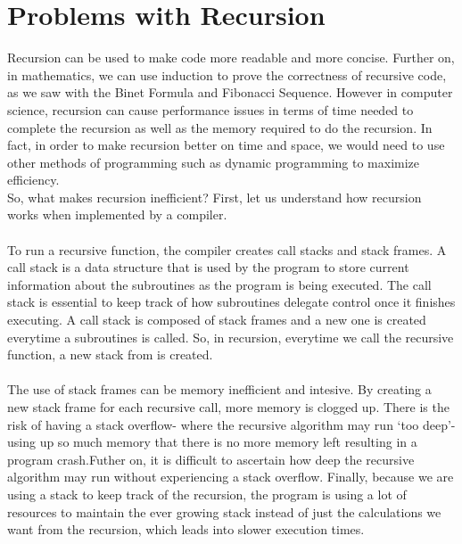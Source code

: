 \documentclass{article}
\begin{document}
\section{Problems with Recursion}

Recursion can be used to make code more readable and more concise. Further on, in mathematics, we can use induction to prove the correctness of recursive code, as we saw with the Binet Formula and Fibonacci Sequence. However in computer science, recursion can cause performance issues in terms of time needed to complete the recursion as well as the memory required to do the recursion.  In fact, in order to make recursion better on time and space, we would need to use other methods of programming such as dynamic programming to maximize efficiency. 
~\\
So, what makes recursion inefficient? First, let us understand how recursion works when implemented by a compiler.
\\ 
~\\
To run a recursive function, the compiler creates call stacks and stack frames. A call stack is a data structure that is used by the program to store current information about the subroutines as the program is being executed. The call stack is essential to keep track of how subroutines delegate control once it finishes executing. A call stack is composed of stack frames and a new one is created everytime a subroutines is called. So, in recursion, everytime we call the recursive function, a new stack from is created. 
\\
~\\
The use of stack frames can be memory inefficient and intesive. By creating a new stack frame for each recursive call, more memory is clogged up.  There is the risk of having a stack overflow- where the recursive algorithm may run `too deep'- using up so much memory that there is no more memory left resulting in a program crash.Futher on, it is difficult to ascertain how deep the recursive algorithm may run without experiencing a stack overflow.  Finally, because we are using a stack to keep track of the recursion, the program is using a lot of resources to maintain the ever growing stack instead of just the calculations we want from the recursion, which leads into slower execution times. 
\\
\end{document}
